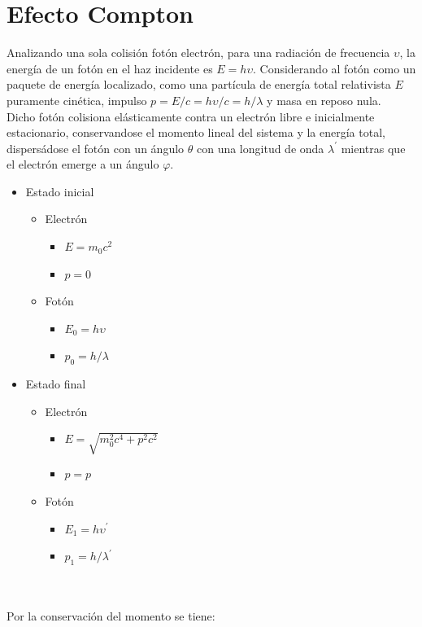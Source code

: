 \documentclass[oneside]{book}
\numberwithin{equation}{section}
\numberwithin{figure}{section}
\numberwithin{table}{section}
\begin{document}
		\section{Efecto Compton}
					
			Analizando una sola colisión fotón electrón, para una radiación de frecuencia $\upsilon$, la energía de un fotón en el haz incidente es $E=h\upsilon$. Considerando al fotón como un paquete de energía localizado, como una partícula de energía total relativista $E$ puramente cinética, impulso $p=E/c=h\upsilon/c=h/\lambda$ y masa en reposo nula.\\
			
			Dicho fotón colisiona elásticamente contra un electrón libre e inicialmente estacionario, conservandose el momento lineal del sistema y la energía total, dispersádose el fotón con un ángulo $\theta$ con una longitud de onda $\lambda^\prime$ mientras que el electrón emerge a un ángulo $\varphi$.\\

\begin{minipage}[t]{0.5\textwidth}
	\begin{itemize}
		\item Estado inicial
			\begin{itemize}
				\item Electrón
					\begin{itemize}
						\item $E=m_0c^2$
						\item $p=0$
					\end{itemize}
				\item Fotón
					\begin{itemize}
						\item $E_0=h\upsilon$
						\item $p_0=h/\lambda$
					\end{itemize}
			\end{itemize}
	\end{itemize}						
\end{minipage}
\begin{minipage}[t]{0.5\textwidth}
	\begin{itemize}
		\item Estado final
			\begin{itemize}
				\item Electrón
					\begin{itemize}
						\item $E=\sqrt{m_0^2c^4+p^2c^2}$
						\item $p=p$
					\end{itemize}
				\item Fotón
					\begin{itemize}
						\item $E_1=h\upsilon^\prime$
						\item $p_1=h/\lambda^\prime$
					\end{itemize}
			\end{itemize}
	\end{itemize}						
\end{minipage}\\
\\
		Por la conservación del momento se tiene:\\
		
\end{document}
